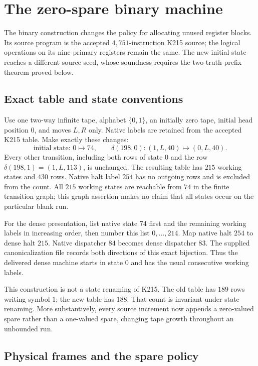 \section{The zero-spare binary machine}
\label{sec:z215-machine}

The binary construction changes the policy for allocating unused register
blocks.  Its source program is the accepted $4{,}751$-instruction K215 source;
the logical operations on its nine primary registers remain the same.  The
new initial state reaches a different source seed, whose soundness requires
the two-truth-prefix theorem proved below.

\subsection{Exact table and state conventions}

Use one two-way infinite tape, alphabet $\{0,1\}$, an initially zero tape,
initial head position $0$, and moves $L,R$ only.  Native labels are retained
from the accepted K215 table.  Make exactly these changes:
\[
 \text{initial state: }0\longmapsto74,
 \qquad
 \delta(198,0): (1,L,40)\longmapsto(0,L,40).
\]
Every other transition, including both rows of state $0$ and the row
$\delta(198,1)=(1,L,113)$, is unchanged.  The resulting table has
$215$ working states and $430$ rows.  Native halt label $254$ has no outgoing
rows and is excluded from the count.  All $215$ working states are reachable
from $74$ in the finite transition graph; this graph assertion makes no claim
that all states occur on the particular blank run.

For the dense presentation, list native state $74$ first and the remaining
working labels in increasing order, then number this list $0,\ldots,214$.
Map native halt $254$ to dense halt $215$.  Native dispatcher $84$ becomes
dense dispatcher $83$.  The supplied canonicalization file records both
directions of this exact bijection.  Thus the delivered dense machine starts
in state $0$ and has the usual consecutive working labels.

This construction is not a state renaming of K215.  The old table has $189$
rows writing symbol $1$; the new table has $188$.  That count is invariant
under state renaming.  More substantively, every source increment now appends
a zero-valued spare rather than a one-valued spare, changing tape growth
throughout an unbounded run.

\subsection{Physical frames and the spare policy}

